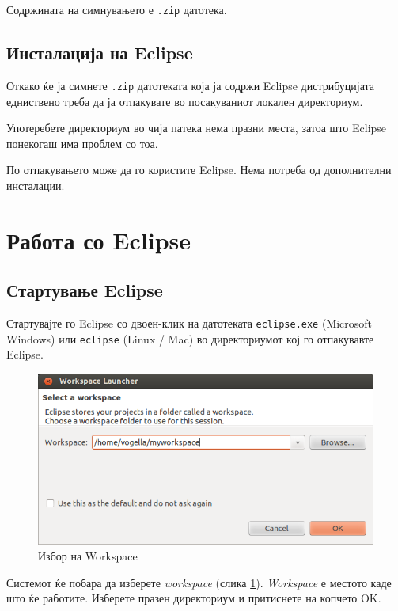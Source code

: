Содржината на симнувањето е \texttt{.zip} датотека.

\subsection{Инсталација на Eclipse}

Откако ќе ја симнете \texttt{.zip} датотеката која ја содржи Eclipse
дистрибуцијата едниствено треба да ја отпакувате во посакуваниот локален
директориум.

Употеребете директориум во чија патека нема празни места, затоа што Eclipse
понекогаш има проблем со тоа.

По отпакувањето може да го користите Eclipse. Нема потреба од дополнителни
инсталации.

\section{Работа со Eclipse}

\subsection{Стартување Eclipse}

Стартувајте го Eclipse со двоен-клик на датотеката \texttt{eclipse.exe}
(Microsoft Windows) или \texttt{eclipse} (Linux / Mac) во директориумот кој го
отпакувавте Eclipse.

\begin{figure}[htb]
\centering
\includegraphics[scale=.5]{images/workspace}
\caption{Избор на Workspace}
\label{fig:workspace}
\end{figure}


Системот ќе побара да изберете \emph{workspace} (слика
\ref{fig:workspace}). \emph{Workspace} е местото каде што ќе работите. Изберете
празен директориум и притиснете на копчето OK.


